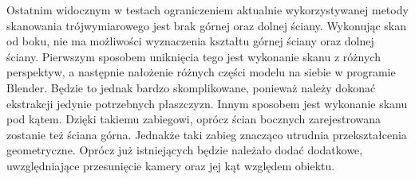 Ostatnim widocznym w testach ograniczeniem aktualnie wykorzystywanej metody skanowania trójwymiarowego jest brak górnej oraz dolnej ściany. Wykonując skan od boku, nie ma możliwości wyznaczenia kształtu górnej ściany oraz dolnej ściany. Pierwszym sposobem uniknięcia tego jest wykonanie skanu z różnych perspektyw, a następnie nałożenie różnych części modelu na siebie w programie Blender. Będzie to jednak bardzo skomplikowane, ponieważ należy dokonać ekstrakcji jedynie potrzebnych płaszczyzn. Innym sposobem jest wykonanie skanu pod kątem. Dzięki takiemu zabiegowi, oprócz ścian bocznych zarejestrowana zostanie też ściana górna. Jednakże  taki zabieg znacząco utrudnia przekształcenia geometryczne. Oprócz już istniejących będzie należało dodać dodatkowe, uwzględniające przesunięcie kamery oraz jej kąt względem obiektu.



